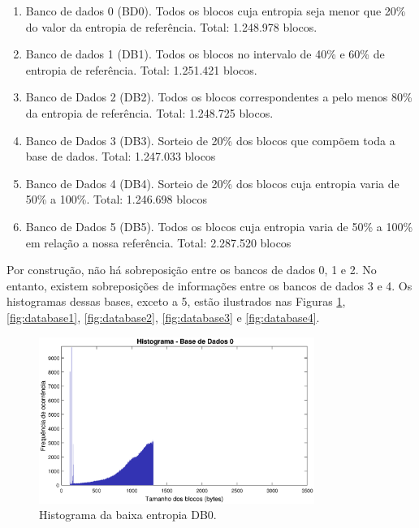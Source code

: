 \begin {enumerate}
\label{list:bds}
\item Banco de dados 0 (BD0). Todos os blocos cuja entropia seja menor que 20\% do valor da entropia de referência. Total: 1.248.978 blocos. 
\item Banco de dados 1 (DB1). Todos os blocos no intervalo de 40\% e 60\% de entropia de referência. Total: 1.251.421 blocos.
\item Banco de Dados 2 (DB2). Todos os blocos correspondentes a pelo menos 80\% da entropia de referência. Total: 1.248.725 blocos.
\item Banco de Dados 3 (DB3). Sorteio de 20\% dos blocos que compõem toda a base de dados. Total: 1.247.033 blocos
\item Banco de Dados 4 (DB4). Sorteio de 20\% dos blocos cuja entropia varia de 50\% a 100\%. Total: 1.246.698 blocos
\item Banco de Dados 5 (DB5). Todos os blocos cuja entropia varia de 50\% a 100\% em relação a nossa referência. Total: 2.287.520 blocos
\end{enumerate}


Por construção, não há sobreposição entre os bancos de dados 0, 1 e 2. No entanto, existem sobreposições de informações entre os bancos de dados 3 e 4. Os histogramas dessas bases, exceto a 5, estão ilustrados nas Figuras \ref{fig:database0}, \ref{fig:database1}, \ref{fig:database2}, \ref{fig:database3} e \ref{fig:database4}.



\begin{figure}
\centering
\includegraphics[width=0.8\textwidth]{figuras/hist0.eps}
\caption{Histograma da baixa entropia DB0.}
\label{fig:database0}
\end{figure}

